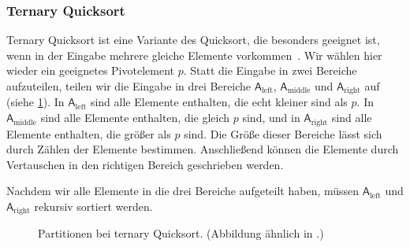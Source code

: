 \subsubsection{Ternary Quicksort}
\label{section:ternary_quicksort}

\noindent
Ternary Quicksort ist eine Variante des Quicksort, die besonders geeignet ist,
wenn in der Eingabe mehrere gleiche Elemente vorkommen~\cite{ternary_quicksort}.
Wir wählen hier wieder ein geeignetes Pivotelement $p$.
Statt die Eingabe in zwei Bereiche aufzuteilen, teilen wir die Eingabe in drei Bereiche $\mathsf{A}_{\text{left}}$, $\mathsf{A}_{\text{middle}}$ und $\mathsf{A}_{\text{right}}$ auf (siehe \cref{fg:ternary_partitions}).
In $\mathsf{A}_{\text{left}}$ sind alle Elemente enthalten, die echt kleiner sind als $p$.
In $\mathsf{A}_{\text{middle}}$ sind alle Elemente enthalten, die gleich $p$ sind, und in $\mathsf{A}_{\text{right}}$ sind alle Elemente enthalten, die größer als $p$ sind.
Die Größe dieser Bereiche lässt sich durch Zählen der Elemente bestimmen.
Anschließend können die Elemente durch Vertauschen in den richtigen Bereich geschrieben werden.

Nachdem wir alle Elemente in die drei Bereiche aufgeteilt haben, müssen $\mathsf{A}_{\text{left}}$ und $\mathsf{A}_{\text{right}}$ rekursiv sortiert werden.

\begin{figure}[!h]
	\centering
	\caption[Partitionen bei ternary Quicksort]{Partitionen bei ternary Quicksort. (Abbildung ähnlich in \cite{ternary_quicksort}.)}
	\label{fg:ternary_partitions}
\end{figure}

